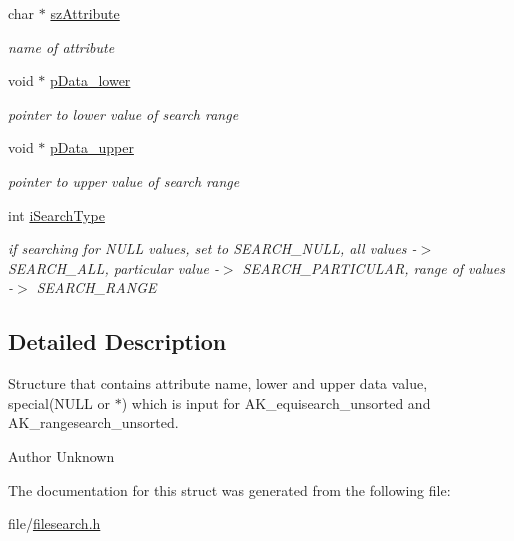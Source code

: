 \begin{DoxyCompactItemize}
\item 
char $\ast$ \hyperlink{structsearch__params_ae8faeffae5fba755ed9f93a0028200ce}{sz\+Attribute}\hypertarget{structsearch__params_ae8faeffae5fba755ed9f93a0028200ce}{}\label{structsearch__params_ae8faeffae5fba755ed9f93a0028200ce}

\begin{DoxyCompactList}\small\item\em name of attribute \end{DoxyCompactList}\item 
void $\ast$ \hyperlink{structsearch__params_a061c7b5e9a3163f19dac0d3a681d63d0}{p\+Data\+\_\+lower}\hypertarget{structsearch__params_a061c7b5e9a3163f19dac0d3a681d63d0}{}\label{structsearch__params_a061c7b5e9a3163f19dac0d3a681d63d0}

\begin{DoxyCompactList}\small\item\em pointer to lower value of search range \end{DoxyCompactList}\item 
void $\ast$ \hyperlink{structsearch__params_ab5b610fb21d476cb745ea943f8cf01f8}{p\+Data\+\_\+upper}\hypertarget{structsearch__params_ab5b610fb21d476cb745ea943f8cf01f8}{}\label{structsearch__params_ab5b610fb21d476cb745ea943f8cf01f8}

\begin{DoxyCompactList}\small\item\em pointer to upper value of search range \end{DoxyCompactList}\item 
int \hyperlink{structsearch__params_afbc6035423d003364a44bc5c984b49fa}{i\+Search\+Type}\hypertarget{structsearch__params_afbc6035423d003364a44bc5c984b49fa}{}\label{structsearch__params_afbc6035423d003364a44bc5c984b49fa}

\begin{DoxyCompactList}\small\item\em if searching for N\+U\+LL values, set to S\+E\+A\+R\+C\+H\+\_\+\+N\+U\+LL, all values -\/$>$ S\+E\+A\+R\+C\+H\+\_\+\+A\+LL, particular value -\/$>$ S\+E\+A\+R\+C\+H\+\_\+\+P\+A\+R\+T\+I\+C\+U\+L\+AR, range of values -\/$>$ S\+E\+A\+R\+C\+H\+\_\+\+R\+A\+N\+GE \end{DoxyCompactList}\end{DoxyCompactItemize}


\subsection{Detailed Description}
Structure that contains attribute name, lower and upper data value, special(\+N\+U\+L\+L or $\ast$) which is input for A\+K\+\_\+equisearch\+\_\+unsorted and A\+K\+\_\+rangesearch\+\_\+unsorted. 

\begin{DoxyAuthor}{Author}
Unknown 
\end{DoxyAuthor}


The documentation for this struct was generated from the following file\+:\begin{DoxyCompactItemize}
\item 
file/\hyperlink{filesearch_8h}{filesearch.\+h}\end{DoxyCompactItemize}
